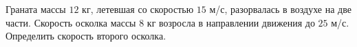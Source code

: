 Граната массы $12$ кг, летевшая со скоростью $15$ м/с,
разорвалась в воздухе на две части.
Скорость осколка массы $8$ кг
возросла в направлении движения до $25$ м/с.
Определить скорость второго осколка.
